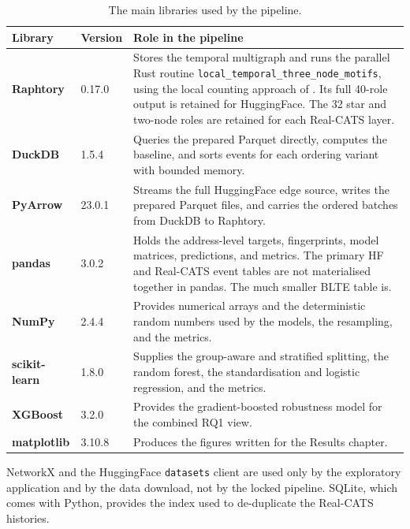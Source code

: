 \begin{table}[h]
\centering
\caption{The main libraries used by the pipeline.}
\label{tab:libraries}
\renewcommand{\arraystretch}{1.3}
\small
\begin{tabular}{p{2.7cm} p{1.5cm} p{8.5cm}}
\toprule
\textbf{Library} & \textbf{Version} & \textbf{Role in the pipeline} \\
\midrule

\textbf{Raphtory} &
  0.17.0 &
  Stores the temporal multigraph and runs the parallel Rust routine
  \texttt{local\_temporal\_three\_node\_motifs}, using the local counting
  approach of \citet{arnold2024motifs}. Its full 40-role output is retained for HuggingFace.
  The 32 star and two-node roles are retained for each Real-CATS layer. \\

\textbf{DuckDB} &
  1.5.4 &
  Queries the prepared Parquet directly, computes the baseline, and sorts events
  for each ordering variant with bounded memory. \\

\textbf{PyArrow} &
  23.0.1 &
  Streams the full HuggingFace edge source, writes the prepared Parquet files,
  and carries the ordered batches from DuckDB to Raphtory. \\

\textbf{pandas} &
  3.0.2 &
  Holds the address-level targets, fingerprints, model matrices, predictions, and
  metrics. The primary HF and Real-CATS event tables are not materialised
  together in pandas. The much smaller BLTE table is. \\

\textbf{NumPy} &
  2.4.4 &
  Provides numerical arrays and the deterministic random numbers used by the
  models, the resampling, and the metrics. \\

\textbf{scikit-learn} &
  1.8.0 &
  Supplies the group-aware and stratified splitting, the random forest, the
  standardisation and logistic regression, and the metrics. \\

\textbf{XGBoost} &
  3.2.0 &
  Provides the gradient-boosted robustness model for the combined RQ1 view. \\

\textbf{matplotlib} &
  3.10.8 &
  Produces the figures written for the Results chapter. \\

\bottomrule
\end{tabular}
\end{table}

NetworkX and the HuggingFace \texttt{datasets} client are used only by the
exploratory application and by the data download, not by the locked pipeline.
SQLite, which comes with Python, provides the index used to de-duplicate the
Real-CATS histories.
